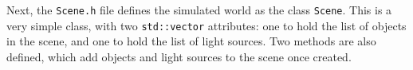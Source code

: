 \documentclass[a4paper]{article}
\begin{document}
Next, the \verb|Scene.h| file defines the simulated world as the class \verb|Scene|. This is a very simple class, with two \verb|std::vector| attributes: one to hold the list of objects in the scene, and one to hold the list of light sources. Two methods are also defined, which add objects and light sources to the scene once created.


\begin{appendix}
\end{appendix}
\end{document}
